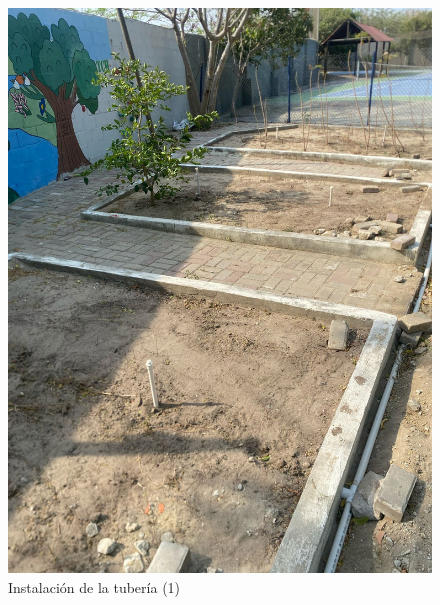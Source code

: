 \documentclass[12pt]{article}
\begin{document}
\begin{figure}[h!]
      \centering
      \begin{minipage}[b]{0.48\textwidth}
            \includegraphics[width=\textwidth]{imagenes/sprinkler2.jpg}
            \caption{Instalación de la tubería (1)}
            \label{fig:sprinkler2}
      \end{minipage}
      \hfill
      \begin{minipage}[b]{0.48\textwidth}

\end{minipage}
\end{figure}
\end{document}
